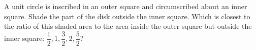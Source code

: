 A unit circle is inscribed in an outer square and circumscribed about an inner square. Shade the part of the disk outside the inner square. Which is closest to the ratio of this shaded area to the area inside the outer square but outside the inner square: $\dfrac{1}{2},1,\dfrac{3}{2},2,\dfrac{5}{2}$?
